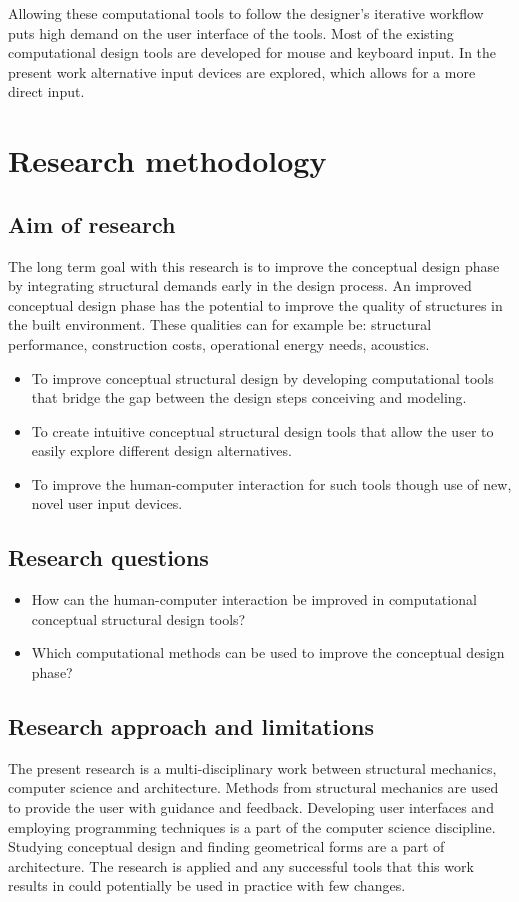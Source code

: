 Allowing these computational tools to follow the designer’s iterative workflow puts high demand on the user interface of the tools. Most of the existing computational design tools are developed for mouse and keyboard input. In the present work alternative input devices are explored, which allows for a more direct input. 

\section{Research methodology }
\subsection{Aim of research}
The long term goal with this research is to improve the conceptual design phase by integrating structural demands early in the design process. An improved conceptual design phase has the potential to improve the quality of structures in the built environment. These qualities can for example be: structural performance, construction costs, operational energy needs, acoustics.


\begin{itemize}  
\item To improve conceptual structural design by developing computational tools that bridge the gap between the design steps conceiving and modeling.
\item  To create intuitive conceptual structural design tools that allow the user to easily explore different design alternatives.
\item To improve the human-computer interaction for such tools though use of new, novel user input devices. 
\end{itemize}


\subsection{Research questions}
\begin{itemize}  
\item How can the human-computer interaction be improved in computational conceptual structural design tools?
\item  Which computational methods can be used to improve the conceptual design phase? 
\end{itemize}

\subsection{Research approach and limitations}
The present research is a multi-disciplinary work between structural mechanics, computer science and architecture. Methods from structural mechanics are used to provide the user with guidance and feedback. Developing user interfaces and employing programming techniques is a part of the computer science discipline. Studying conceptual design and finding geometrical forms are a part of architecture. The research is applied and any successful tools that this work results in could potentially be used in practice with few changes.

